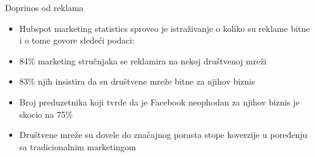 \documentclass{beamer}
\begin{document}
	\begin{frame}{Doprinos od reklama}
		\begin{itemize}
			\item Hubspot marketing statistics sproveo je istraživanje o koliko su reklame bitne i o tome govore sledeći podaci:
			\item 84\% marketing stručnjaka se reklamira na nekoj društvenoj mreži
			\item 83\% njih insistira da su društvene mreže bitne za njihov biznis
			\item Broj preduzetnika koji tvrde da je Facebook neophodan za njihov biznis je skocio na 75\%
			\item Društvene mreže su dovele do značajnog porasta stope koverzije u poređenju sa tradicionalnim marketingom 
		\end{itemize}
	\end{frame}
	
\end{document}
